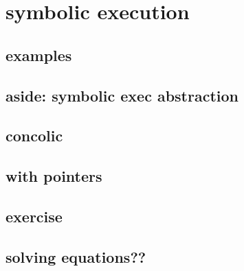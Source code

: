 \section{symbolic execution}



\subsection{examples}




\subsection{aside: symbolic exec abstraction}


\subsection{concolic}


%

\subsection{with pointers}


\subsection{exercise}


\subsection{solving equations??}


